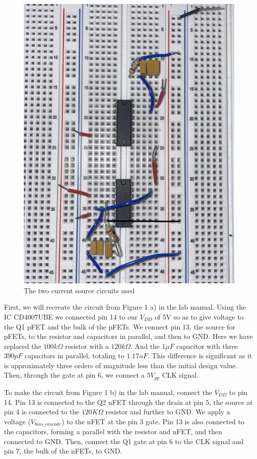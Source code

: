 \documentclass[onecolumn]{article}
\begin{document}
\begin{figure}[H]
    \centering
    \includegraphics[scale=0.5]{LAB3/in3170lab3task1circuit.jpg}
    \caption{The two current source circuits used}
    \label{fig:enter-label}
\end{figure}

First, we will recreate the circuit from Figure 1 a) in the lab manual. Using the IC CD4007UBE we connected pin 14 to our $V_{DD}$ of 5V so as to give voltage to the Q1 pFET and the bulk of the pFETs. We connect pin 13, the source for pFETs, to the resistor and capacitors in parallel, and then to GND. Here we have replaced the $100k\Omega$ resistor with a $120k\Omega$. And the $1\mu F$ capacitor with three $390pF$ capacitors in parallel, totaling to $1.17nF$. This difference is significant as it is approximately three orders of magnitude less than the initial design value. Then, through the gate at pin 6, we connect a $5V_{pp}$ CLK signal.

To make the circuit from Figure 1 b) in the lab manual, connect the $V_{DD}$ to pin 14. Pin 13 is connected to the Q2 nFET through the drain at pin 5, the source at pin 4 is connected to the $120K\Omega$ resistor and further to GND. We apply a voltage ($V_{bias\_cascode}$) to the nFET at the pin 3 gate. Pin 13 is also connected to the capacitors, forming a parallel with the resistor and nFET, and then connected to GND. Then, connect the Q1 gate at pin 6 to the CLK signal and pin 7, the bulk of the nFETs, to GND.
\end{document}
